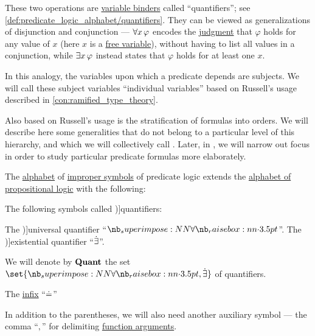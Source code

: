 \begin{remark}
  These two operations are \hyperref[con:variable_binding]{variable binders} called \enquote{quantifiers}; see \cref{def:predicate_logic_alphabet/quantifiers}. They can be viewed as generalizations of disjunction and conjunction --- \( \qforall* x \varphi \) encodes the \hyperref[con:judgment]{judgment} that \( \varphi \) holds for any value of \( x \) (here \( x \) is a \hyperref[con:variable_binding]{free variable}), without having to list all values in a conjunction, while \( \qexists* x \varphi \) instead states that \( \varphi \) holds for at least one \( x \).

  In this analogy, the variables upon which a predicate depends are subjects. We will call these subject variables \enquote{individual variables} based on Russell's usage described in \cref{con:ramified_type_theory}.

  Also based on Russell's usage is the stratification of formulas into orders. We will describe here some generalities that do not belong to a particular level of this hierarchy, and which we will collectively call . Later, in , we will narrow out focus in order to study particular predicate formulas more elaborately.
\end{remark}

\begin{definition}\label{def:predicate_logic_alphabet}\mimprovised
  The \hyperref[def:formal_language/alphabet]{alphabet} of \hyperref[con:improper_symbol]{improper symbols} of predicate logic extends the \hyperref[def:propositional_alphabet]{alphabet of propositional logic} with the following:
  \begin{thmenum}
     The following symbols called \term[ru=кванторы (\cite[72]{ШеньВерещагин2017ЯзыкиИИсчисления})]{quantifiers}:
    \begin{thmenum}
       The \term[ru=квантор общости (\cite[61]{Эдельман1975Логика})]{universal quantifier} \enquote{\( \synforall \)}.
       The \term[ru=квантор существования (\cite[61]{Эдельман1975Логика})]{existential quantifier} \enquote{\( \mathord{\dot{\exists}} \)}.
    \end{thmenum}

    We will denote by \( \op*{Quant} \) the set \( \set{ \synforall, \synexists } \) of quantifiers.

     The \hyperref[def:function_application_syntax]{infix}  \enquote{\( \doteq \)}

     In addition to the parentheses, we will also need another auxiliary symbol --- the comma \enquote{\( , \)} for delimiting \hyperref[con:function_arguments]{function arguments}.
  \end{thmenum}
\end{definition}


